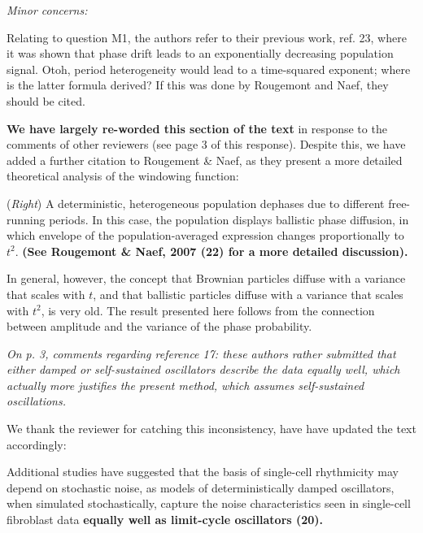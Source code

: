 \documentclass[11pt, letterpaper]{article}
\newenvironment{reviewer}{\itshape\color{gray}}{}
\newenvironment{manuscript}[1]{\begin{center}\begin{tcolorbox}[colback=green!5!white,colframe=green!75!black,width=\textwidth,title={#1},breakable,fonttitle=\bfseries]}{\end{tcolorbox}\end{center}}
\begin{document}
\begin{reviewer}
Minor concerns:

Relating to question M1, the authors refer to their previous work, ref. 23, where it was shown that phase drift leads to an exponentially decreasing population signal. Otoh, period heterogeneity would lead to a time-squared exponent; where is the latter formula derived? If this was done by Rougemont and Naef, they should be cited.
\end{reviewer}

{\bfseries We have largely re-worded this section of the text} in response to the comments of other reviewers (see page 3 of this response). Despite this, we have added a further citation to Rougement \& Naef, as they present a more detailed theoretical analysis of the windowing function:

\begin{manuscript}{Page 16}
   ({\itshape Right}) A deterministic, heterogeneous population dephases due to different free-running periods. In this case, the population displays ballistic phase diffusion, in which envelope of the population-averaged expression changes proportionally to $t^2$. {\bfseries (See Rougemont \& Naef, 2007 (22) for a more detailed discussion).}
\end{manuscript}

In general, however, the concept that Brownian particles diffuse with a variance that scales with $t$, and that ballistic particles diffuse with a variance that scales with $t^2$, is very old. The result presented here follows from the connection between amplitude and the variance of the phase probability.

\begin{reviewer}
On p. 3, comments regarding reference 17: these authors rather submitted that either damped or self-sustained oscillators describe the data equally well, which actually more justifies the present method, which assumes self-sustained oscillations.
\end{reviewer}

We thank the reviewer for catching this inconsistency, have have updated the text accordingly:

\begin{manuscript}{Page 3}
  Additional studies have suggested that the basis of single-cell rhythmicity may depend on stochastic noise, as models of deterministically damped oscillators, when simulated stochastically, capture the noise characteristics seen in single-cell fibroblast data {\bfseries equally well as limit-cycle oscillators (20).}
\end{manuscript}
\end{document}

